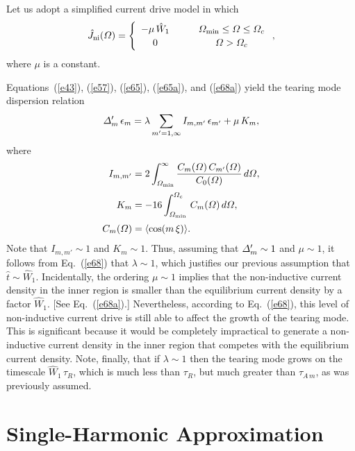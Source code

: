 \documentclass[12pt,prb,aps]{revtex4-1}
\begin{document}
Let us adopt a simplified current drive model in which 
\begin{equation}\label{e68a}
\hat{J}_{\rm ni}({\mit\Omega}) = \left\{
\begin{array}{ccc} -\mu\,\hat{W}_1&~~~&{\mit\Omega}_{\rm min}\leq {\mit\Omega} \leq {\mit\Omega}_c\\[0.5ex]
0&&{\mit\Omega}>{\mit\Omega}_c\end{array}\right.,
\end{equation}
where $\mu$ is a constant. 

Equations~(\ref{e43}), (\ref{e57}), (\ref{e65}), (\ref{e65a}), and (\ref{e68a}) yield the tearing mode dispersion relation
\begin{equation}\label{e68}
{\mit\Delta}_m'\,\epsilon_m = \lambda\sum_{m'=1,\infty}I_{m,m'}\,\epsilon_{m'} + \mu\,K_m,
\end{equation}
where 
\begin{align}
I_{m,m' } &= 2\int_{{\mit\Omega}_{\rm min}}^\infty\frac{C_m({\mit\Omega})\,C_{m'}({\mit\Omega})}{C_0({\mit\Omega})}\,d{\mit\Omega},\\[0.5ex]
K_m &= -16\int_{{\mit\Omega}_{\rm min}}^{\mit\Omega_c}\,C_m({\mit\Omega})
\,d{\mit\Omega},\label{e70}\\[0.5ex]
C_m({\mit\Omega})& = \langle\cos(m\,\xi)\rangle.\label{e72}
\end{align}
Note  that $I_{m,m'}\sim 1$ and $K_m\sim 1$. Thus, assuming
that ${\mit\Delta}_m'\sim 1$ and $\mu\sim 1$, it follows from Eq.~(\ref{e68}) that $\lambda\sim 1$, which justifies our previous assumption that $\hat{t}\sim \hat{W}_1$. Incidentally, the ordering  $\mu\sim 1$ implies that the
non-inductive current density in the inner region is smaller than the equilibrium current density by a factor $\hat{W}_1$.
[See Eq.~(\ref{e68a}).]
Nevertheless, according to Eq.~(\ref{e68}), this level of non-inductive current drive is still able to affect the growth of the tearing mode. 
This is significant because it would be completely impractical to generate a non-inductive current density
in the inner region that competes with the equilibrium current density.  Note, finally, that if $\lambda\sim 1$ then the tearing mode grows on the timescale $\hat{W}_1\,\tau_R$, which is much less than $\tau_R$, but much greater than
$\tau_{A\,m}$, as was previously assumed. 

\section{Single-Harmonic Approximation}\label{s1}
\end{document}
